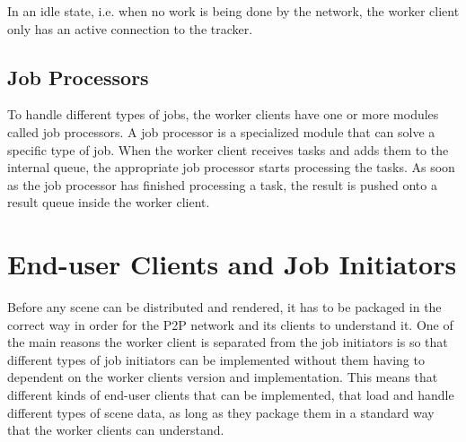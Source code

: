 In an idle state, i.e. when no work is being done by the network, the worker client only has an active connection to the tracker.






\subsection{Job Processors}
  To handle different types of jobs, the worker clients have one or more modules called job processors. A job processor is a specialized module that can solve a specific type of job. When the worker client receives tasks and adds them to the internal queue, the appropriate job processor starts processing the tasks. As soon as the job processor has finished processing a task, the result is pushed onto a result queue inside the worker client.

\section{End-user Clients and Job Initiators}
Before any scene can be distributed and rendered, it has to be packaged in the correct way in order for the P2P network and its clients to understand it. One of the main reasons the worker client is separated from the job initiators is so that different types of job initiators can be implemented without them having to dependent on the worker clients version and implementation. This means that  different kinds of end-user clients that can be implemented, that load and handle different types of scene data, as long as they package them in a standard way that the worker clients can understand.

